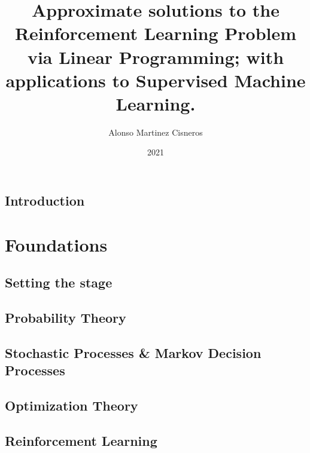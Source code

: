 \documentclass[colorful]{sty/itam-thesis}
\author{Alonso Martinez Cisneros}
\title{Approximate solutions to the Reinforcement Learning 
Problem via Linear Programming; with applications to Supervised 
Machine Learning.}
\date{2021}
\begin{document}
\frontmatter
{}
\maketitle
\makefrontmatter

\cleardoublepage
\pagestyle{plain}






\tableofcontents

\mainmatter


% 
\chapter*{Introduction}
% 

\part{Foundations}

\chapter{Setting the stage}
% 

\chapter{Probability Theory}

\chapter{Stochastic Processes \& Markov Decision Processes}
% 

\chapter{Optimization Theory}

\chapter{Reinforcement Learning}
% 
\end{document}
